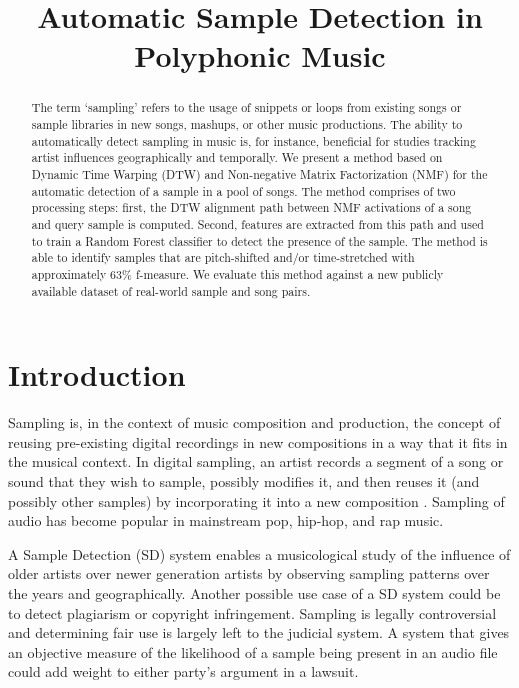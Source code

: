 \documentclass{article}
\title{Automatic Sample Detection in Polyphonic Music}
\begin{document}
%
\maketitle
%
\begin{abstract}
The term `sampling' refers to the usage of snippets or loops from existing songs or sample libraries in new songs, mashups, or other music productions. The ability to automatically detect sampling in music is, for instance, beneficial for studies tracking artist influences geographically and temporally. We present a method based on Dynamic Time Warping (DTW) and Non-negative Matrix Factorization (NMF) for the automatic detection of a sample in a pool of songs. The method comprises of two processing steps: first, the DTW alignment path between NMF activations of a song and query sample is computed. Second, features are extracted from this path and used to train a Random Forest classifier to detect the presence of the sample. The method is able to identify samples that are pitch-shifted and/or time-stretched with approximately 63\% f-measure. We evaluate this method against a new publicly available dataset of real-world sample and song pairs.
\end{abstract}
%
\section{Introduction}
\label{sec:intro}

Sampling is, in the context of music composition and production, the concept of reusing pre-existing digital recordings in new compositions in a way that it fits in the musical context. In digital sampling, an artist records a segment of a song or sound that they wish to sample, possibly modifies it, and then reuses it (and possibly other samples) by incorporating it into a new composition \cite{katz_capturing_2004}. Sampling of audio has become popular in mainstream pop, hip-hop, and rap music. 

A Sample Detection (SD) system enables a musicological study of the influence of older artists over newer generation artists by observing sampling patterns over the years and geographically.
%
Another possible use case of a SD system could be to detect plagiarism or copyright infringement. Sampling is legally controversial and determining fair use is largely left to the judicial system. A system that gives an objective measure of the likelihood of a sample being present in an audio file could add weight to either party's argument in a lawsuit.
\end{document}
